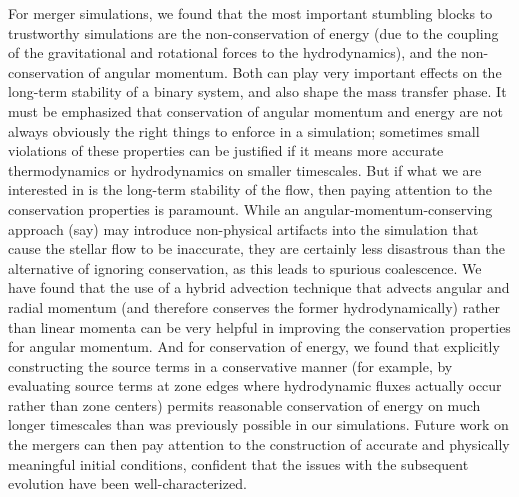 \documentclass[12pt]{article}
\begin{document}
For merger simulations, we found that the most important stumbling blocks to trustworthy
simulations are the non-conservation of energy (due to the coupling of the gravitational
and rotational forces to the hydrodynamics), and the non-conservation of angular momentum.
Both can play very important effects on the long-term stability of a binary system, and
also shape the mass transfer phase. It must be emphasized that conservation of angular momentum
and energy are not always obviously the right things to enforce in a simulation; sometimes
small violations of these properties can be justified if it means more accurate thermodynamics
or hydrodynamics on smaller timescales. But if what we are interested in is the long-term
stability of the flow, then paying attention to the conservation properties is paramount.
While an angular-momentum-conserving approach (say) may introduce non-physical artifacts into
the simulation that cause the stellar flow to be inaccurate, they are certainly less disastrous
than the alternative of ignoring conservation, as this leads to spurious coalescence.
We have found that the use of a hybrid advection technique that advects angular and radial
momentum (and therefore conserves the former hydrodynamically) rather than linear momenta
can be very helpful in improving the conservation properties for angular momentum. And for
conservation of energy, we found that explicitly constructing the source terms in a conservative
manner (for example, by evaluating source terms at zone edges where hydrodynamic fluxes actually
occur rather than zone centers) permits reasonable conservation of energy on much longer
timescales than was previously possible in our simulations. Future work on the mergers can then
pay attention to the construction of accurate and physically meaningful initial conditions,
confident that the issues with the subsequent evolution have been well-characterized.
\end{document}

